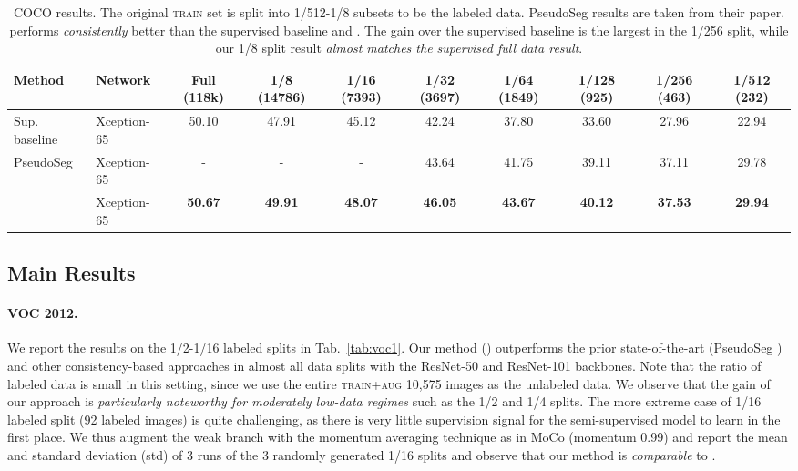 \begin{table*}[tb]
    \small
    \centering
    \caption{COCO results. The original \textsc{train} set is split into 1/512-1/8 subsets to be the labeled data. PseudoSeg \cite{zou2020pseudoseg} results are taken from their paper. \ours{} performs {\em consistently} better than the supervised baseline and \cite{zou2020pseudoseg}. The gain over the supervised baseline is the largest in the 1/256 split, while our 1/8 split result {\em almost matches the supervised full data result}.}
    \label{tab:coco}
    \setlength{\tabcolsep}{2.9pt}
    \begin{tabular}{llcccccccc}
    \toprule
        Method    & Network  & Full (118k) & 1/8 (14786) & 1/16 (7393) & 1/32 (3697) & 1/64 (1849) & 1/128 (925) & 1/256 (463) & 1/512 (232) \\
    \midrule
        Sup. baseline & Xception-65 & 50.10  & 47.91  & 45.12  & 42.24  & 37.80  & 33.60  & 27.96  & 22.94 \\
        PseudoSeg \cite{zou2020pseudoseg}  & Xception-65 & -  & -  & -  & 43.64  & 41.75  & 39.11  & 37.11  & 29.78  \\
        \ours{} & Xception-65 & \textbf{50.67}  & \textbf{49.91}  & \textbf{48.07}  & \textbf{46.05}  & \textbf{43.67}  & \textbf{40.12}  & \textbf{37.53}  & \textbf{29.94}  \\
    \bottomrule
    \end{tabular}
    \vspace{-10pt}
\end{table*}


\subsection{Main Results}

\paragraph{VOC 2012.}
We report the results on the 1/2-1/16 labeled splits in Tab.~\ref{tab:voc1}. Our method (\ours{}) outperforms the prior state-of-the-art (PseudoSeg \cite{zou2020pseudoseg}) and other consistency-based approaches in almost all data splits with the ResNet-50 and ResNet-101 backbones. Note that the ratio of labeled data is small in this setting, since we use the entire \textsc{train}+\textsc{aug} 10,575 images as the unlabeled data. We observe that the gain of our approach is {\em particularly noteworthy for moderately low-data regimes} such as the 1/2 and 1/4 splits. The more extreme case of 1/16 labeled split (92 labeled images) is quite challenging, as there is very little supervision signal for the semi-supervised model to learn in the first place. We thus augment the weak branch with the momentum averaging technique as in MoCo (momentum 0.99) and report the mean and standard deviation (std) of 3 runs of the 3 randomly generated 1/16 splits and observe that our method is {\em comparable} to \cite{zou2020pseudoseg}.


